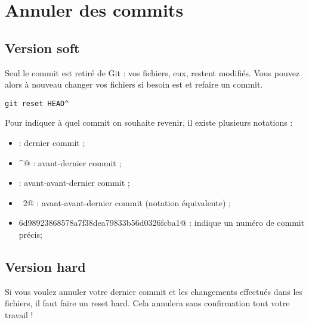 \documentclass[fleqn,11pt]{article}
\begin{document}
\section{Annuler des commits}

\subsection{Version soft}

Seul le commit est retiré de Git : 
vos fichiers, eux, restent modifiés. Vous pouvez alors à nouveau changer vos fichiers si besoin est et refaire un commit.

\begin{lstlisting}
git reset HEAD^
\end{lstlisting}

Pour indiquer à quel commit on souhaite revenir, il existe plusieurs notations :
\begin{itemize}
\item \verb@HEAD@ : dernier commit ;
\item \verb@HEAD^@ : avant-dernier commit ;
\item \verb@HEAD^^@ : avant-avant-dernier commit ;
\item \verb@HEAD~2@ : avant-avant-dernier commit (notation équivalente) ;
\item \verb@d6d98923868578a7f38dea79833b56d0326fcba1@ : indique un numéro de commit précis;
\end{itemize}

\subsection{Version hard}

Si vous voulez annuler votre dernier commit et les changements effectués dans les fichiers, 
il faut faire un reset hard. Cela annulera sans confirmation tout votre travail !
\end{document}
